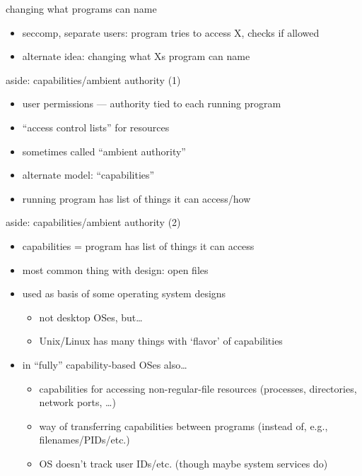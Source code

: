 \begin{frame}{changing what programs can name}
    \begin{itemize}
    \item seccomp, separate users: program tries to access X, checks if allowed
    \vspace{.5cm}
    \item alternate idea: changing what Xs program can name
    \end{itemize}
\end{frame}

\begin{frame}{aside: capabilities/ambient authority (1)}
    \begin{itemize}
    \item user permissions --- authority tied to each running program
    \item ``access control lists'' for resources
    \item sometimes called ``ambient authority''
    \vspace{.5cm}
    \item alternate model: ``capabilities''
    \item running program has list of things it can access/how
    \end{itemize}
\end{frame}

\begin{frame}{aside: capabilities/ambient authority (2)}
    \begin{itemize}
    \item capabilities = program has list of things it can access
    \item most common thing with design: open files
    \vspace{.5cm}
    \item used as basis of some operating system designs
        \begin{itemize}
        \item not desktop OSes, but\ldots
        \item Unix/Linux has many things with `flavor' of capabilities
        \end{itemize}
    \item in ``fully'' capability-based OSes also\ldots
        \begin{itemize}
        \item capabilities for accessing non-regular-file resources (processes, directories,
            network ports, \ldots)
        \item way of transferring capabilities between programs (instead of, e.g., filenames/PIDs/etc.)
        \item OS doesn't track user IDs/etc. (though maybe system services do)
        \end{itemize}
    \end{itemize}
\end{frame}

